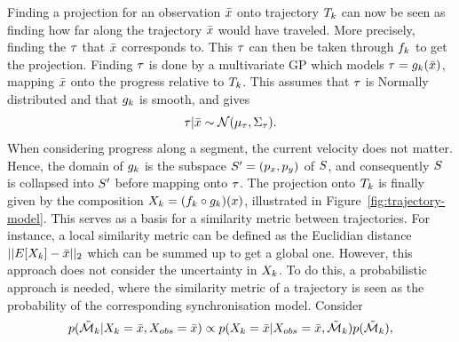 Finding a projection for an observation $\bar{x}$ onto trajectory
$T_{k}$ can now be seen as finding how far along the trajectory $\bar{x}$
would have traveled. More precisely, finding the $\tau$ that $\bar{x}$
corresponds to. This $\tau$ can then be taken through $f_{k}$
to get the projection. Finding $\tau$ is done by a multivariate
GP which models $\tau = g_{k}(\bar{x})$, mapping $\bar{x}$ onto the
progress relative to $T_{k}$. This assumes that $\tau$ is Normally
distributed and that $g_{k}$ is smooth, and gives
\begin{equation}
  \label{eq:g-posterior}
  \tau \vert \bar{x} \sim \mathcal{N}(\mu_{\tau}, \Sigma_{\tau}).
\end{equation}
When considering progress along a segment, the current velocity does not matter. 
Hence, the domain of $g_{k}$ is the subspace 
$S' = (p_x, p_y)$ of $S$, and
consequently $S$ is collapsed into $S'$ before
mapping onto $\tau$. 
The projection onto $T_{k}$ is
finally given by the composition $X_{k} = (f_{k} \circ
g_{k})(x)$, illustrated in Figure~\ref{fig:trajectory-model}.
This serves as a basis for a similarity metric between trajectories.
For instance, a local similarity metric can be defined as the Euclidian
distance $||E[X_{k}] - \bar{x}||_{2}$ which can be summed up
to get a global one. However, this approach does not consider the uncertainty in
$X_{k}$. To do this, a probabilistic approach is needed, where the
similarity metric of a trajectory is seen as the probability of the corresponding
synchronisation model. Consider
\begin{equation}
  \label{eq:model-posterior-probability}
  p(\tilde{\mathcal{M}}_{k} \vert X_{k} = \bar{x}, X_{obs} = \bar{x}) \propto
  p(X_{k} = \bar{x} \vert X_{obs} = \bar{x}, \tilde{\mathcal{M}}_{k})
  p(\tilde{\mathcal{M}}_{k}),
\end{equation}
